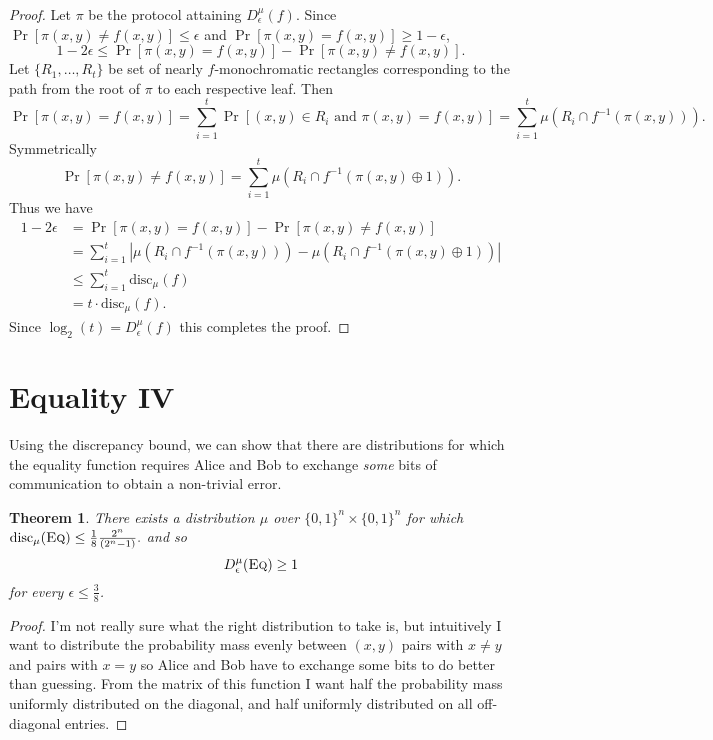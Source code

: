 \documentclass[11pt]{amsart}
\theoremstyle{plain}
\newtheorem{theorem}{Theorem}
\theoremstyle{definition}
\theoremstyle{plain}
\newcommand{\disc}{\mathrm{disc}}
\newcommand{\Eq}{\textsc{Eq}}
\begin{document}
\begin{proof}
Let $\pi$ be the protocol attaining $D_\epsilon^{\mu}(f)$. Since $\Pr[\pi(x,y) \neq f(x,y)] \leq \epsilon$ and $\Pr[\pi(x,y) = f(x,y)] \geq 1-\epsilon$,
$$1-2\epsilon \leq \Pr[\pi(x,y) = f(x,y)] - \Pr[\pi(x,y) \neq f(x,y)].$$
Let $\{R_1, \dots, R_t\}$ be set of nearly $f$-monochromatic rectangles corresponding to the path from the root of $\pi$ to each respective leaf. Then
$$\Pr[\pi(x,y) = f(x,y)] = \sum_{i=1}^t \Pr[(x,y) \in R_i \text{ and }\pi(x,y) = f(x,y) ] = \sum_{i=1}^t \mu(R_i \cap f^{-1}(\pi(x,y))).$$
Symmetrically
$$\Pr[\pi(x,y) \neq f(x,y)] = \sum_{i=1}^t\mu(R_i \cap f^{-1}(\pi(x,y)\oplus 1)).$$
Thus we have
\begin{align*}1-2\epsilon &= \Pr[\pi(x,y) = f(x,y)] - \Pr[\pi(x,y) \neq f(x,y)] \\
&=\sum_{i=1}^t|\mu(R_i\cap f^{-1}(\pi(x,y))) -\mu(R_i \cap f^{-1}(\pi(x,y)\oplus 1))| \\
&\leq \sum_{i=1}^t \disc_\mu(f)\\
&= t\cdot\disc_\mu(f).\end{align*}
Since $\log_2(t) = D_\epsilon^{\mu}(f)$ this completes the proof.
\end{proof}


\newpage \section{Equality IV}

Using the discrepancy bound, we can show that there are distributions for which the equality function requires Alice and Bob to exchange \emph{some} bits of communication to obtain a non-trivial error.

\begin{theorem}
There exists a distribution $\mu$ over $\{0,1\}^n \times \{0,1\}^n$ for which 
$
\disc_\mu(\Eq) \leq \frac18 \frac{2^n}{(2^n-1)}.
$
and so
\[
D^\mu_\epsilon(\Eq) \ge 1
\]
for every $\epsilon \le \frac38$.
\end{theorem}

\begin{proof}
I'm not really sure what the right distribution to take is, but intuitively I want to distribute the probability mass evenly between $(x,y)$ pairs with $x\neq y$ and pairs with $x=y$ so Alice and Bob have to exchange some bits to do better than guessing. From the matrix of this function I want half the probability mass uniformly distributed on the diagonal, and half uniformly distributed on all off-diagonal entries.
\end{proof}
\end{document}

